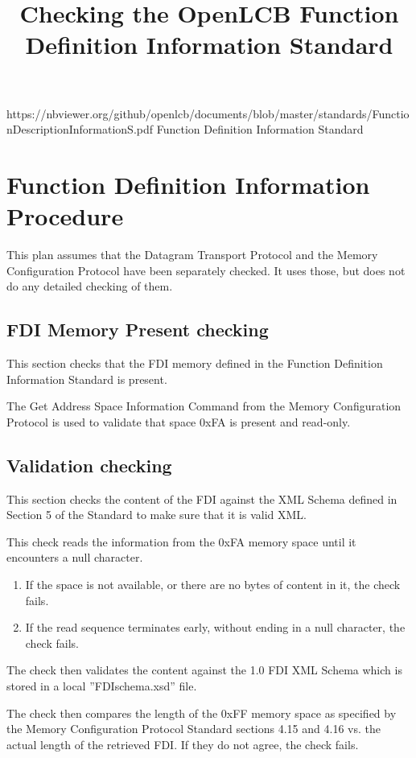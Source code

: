 

\title{Checking the OpenLCB Function Definition Information Standard}


\maketitle


\introductionCaveats
    {https://nbviewer.org/github/openlcb/documents/blob/master/standards/FunctionDescriptionInformationS.pdf}
    {Function Definition Information Standard}

\section{Function Definition Information Procedure}


This plan assumes that the Datagram Transport Protocol and the Memory Configuration Protocol 
have been separately checked. It uses those, but does not do any detailed checking of them.

\subsection{FDI Memory Present checking}

This section checks that the FDI memory defined in the Function 
Definition Information Standard is present.

The Get Address Space Information Command from the Memory Configuration Protocol
is used to validate that space 0xFA is present and read-only.

\subsection{Validation checking}

This section checks the content of the FDI against the XML Schema 
defined in Section 5 of the Standard to make sure that it is valid XML. 

This check reads the information from the 0xFA memory space
until it encounters a null character.
\begin{enumerate}
\item If the space is not available, or there are no bytes of content in it, the check fails.
\item If the read sequence terminates early, without ending in a null character, the check fails.
\end{enumerate}
 
The check then validates the content against the 1.0 FDI XML Schema
which is stored in a local ”FDIschema.xsd” file.

The check then compares the length of the 0xFF memory space 
as specified by the Memory Configuration Protocol Standard sections 4.15 and 4.16
vs. the actual length of the retrieved FDI.
If they do not agree, the check fails.

  
